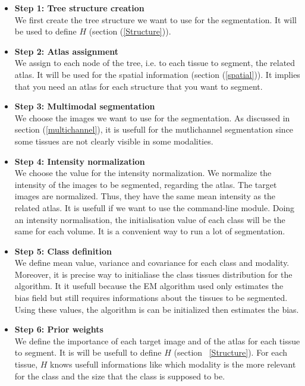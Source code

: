 \begin{itemize}
\item \textbf{Step 1: Tree structure creation}\\
\hspace*{4 mm}We first create the tree structure we want to use for the segmentation. It will be used to define $H$ (section (\ref{Structure})).
%
\item \textbf{Step 2: Atlas assignment}\\
\hspace*{4 mm}We assign to each node of the tree, i.e. to each tissue to segment, the related atlas. It will be used for the spatial information (section (\ref{spatial})). It implies that you need an atlas for each structure that you want to segment.
%
\item \textbf{Step 3: Multimodal segmentation}\\
\hspace*{4 mm}We choose the images we want to use for the segmentation. As discussed in section (\ref{multichannel}), it is usefull for the mutlichannel segmentation since some tissues are not clearly visible in some modalities.
%
\item \textbf{Step 4: Intensity normalization}\\
\hspace*{4 mm}We choose the value for the intensity normalization. We normalize the intensity of the images to be segmented, regarding the atlas. The target images are normalized. Thus, they have the same mean intensity as the related atlas. It is usefull if we want to use the command-line module. Doing an intensity normalisation, the initialisation value of each class will be the same for each volume. It is a convenient way to run a lot of segmentation.
%
\item \textbf{Step 5: Class definition}\\
\hspace*{4 mm}We define mean value, variance and covariance for each class and modality. Moreover, it is precise way to initialiase the class tissues distribution for the algorithm. It it usefull because the EM algorithm used only estimates the bias field but still requires informations about the tissues to be segmented. Using these values, the algorithm is can be initialized then estimates the bias.
%
\item \textbf{Step 6: Prior weights}\\
\hspace*{4 mm}We define the importance of each target image and of the atlas for each tissue to segment. It is will be usefull to define $H$ (section ~\ref{Structure}). For each tissue, $H$ knows usefull informations like which modality is the more relevant  for the class and the size that the class is supposed to be.

\end{itemize}
